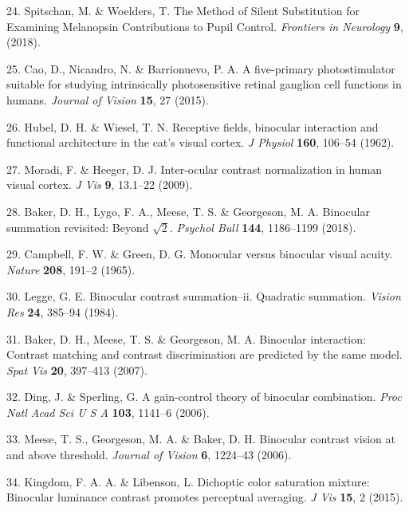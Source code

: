 \documentclass[
]{article}
\begin{document}
\leavevmode\hypertarget{ref-Spitschan2018}{}%
24. Spitschan, M. \& Woelders, T. The Method of Silent Substitution for Examining Melanopsin Contributions to Pupil Control. \emph{Frontiers in Neurology} \textbf{9}, (2018).

\leavevmode\hypertarget{ref-Cao2015}{}%
25. Cao, D., Nicandro, N. \& Barrionuevo, P. A. A five-primary photostimulator suitable for studying intrinsically photosensitive retinal ganglion cell functions in humans. \emph{Journal of Vision} \textbf{15}, 27 (2015).

\leavevmode\hypertarget{ref-Hubel1962}{}%
26. Hubel, D. H. \& Wiesel, T. N. Receptive fields, binocular interaction and functional architecture in the cat's visual cortex. \emph{J Physiol} \textbf{160}, 106--54 (1962).

\leavevmode\hypertarget{ref-Moradi2009}{}%
27. Moradi, F. \& Heeger, D. J. Inter-ocular contrast normalization in human visual cortex. \emph{J Vis} \textbf{9}, 13.1--22 (2009).

\leavevmode\hypertarget{ref-Baker2018}{}%
28. Baker, D. H., Lygo, F. A., Meese, T. S. \& Georgeson, M. A. Binocular summation revisited: Beyond \(\sqrt{2}\). \emph{Psychol Bull} \textbf{144}, 1186--1199 (2018).

\leavevmode\hypertarget{ref-Campbell1965}{}%
29. Campbell, F. W. \& Green, D. G. Monocular versus binocular visual acuity. \emph{Nature} \textbf{208}, 191--2 (1965).

\leavevmode\hypertarget{ref-Legge1984}{}%
30. Legge, G. E. Binocular contrast summation--ii. Quadratic summation. \emph{Vision Res} \textbf{24}, 385--94 (1984).

\leavevmode\hypertarget{ref-Baker2007}{}%
31. Baker, D. H., Meese, T. S. \& Georgeson, M. A. Binocular interaction: Contrast matching and contrast discrimination are predicted by the same model. \emph{Spat Vis} \textbf{20}, 397--413 (2007).

\leavevmode\hypertarget{ref-Ding2006}{}%
32. Ding, J. \& Sperling, G. A gain-control theory of binocular combination. \emph{Proc Natl Acad Sci U S A} \textbf{103}, 1141--6 (2006).

\leavevmode\hypertarget{ref-Meese2006}{}%
33. Meese, T. S., Georgeson, M. A. \& Baker, D. H. Binocular contrast vision at and above threshold. \emph{Journal of Vision} \textbf{6}, 1224--43 (2006).

\leavevmode\hypertarget{ref-Kingdom2015}{}%
34. Kingdom, F. A. A. \& Libenson, L. Dichoptic color saturation mixture: Binocular luminance contrast promotes perceptual averaging. \emph{J Vis} \textbf{15}, 2 (2015).
\end{document}
